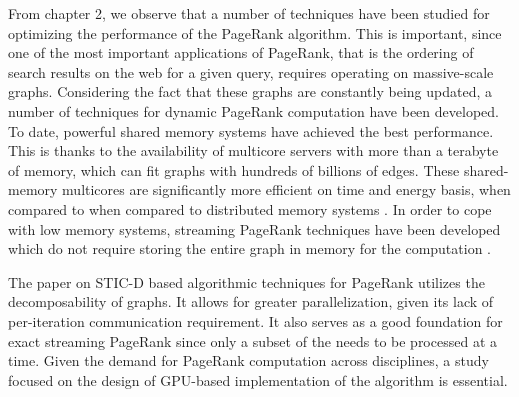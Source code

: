 From chapter 2, we observe that a number of techniques have been studied for optimizing the performance of the PageRank algorithm. This is important, since one of the most important applications of PageRank, that is the ordering of search results on the web for a given query, requires operating on massive-scale graphs. Considering the fact that these graphs are constantly being updated, a number of techniques for dynamic PageRank computation have been developed. To date, powerful shared memory systems have achieved the best performance. This is thanks to the availability of multicore servers with more than a terabyte of memory, which can fit graphs with hundreds of billions of edges. These shared-memory multicores are significantly more efficient on time and energy basis, when compared to when compared to distributed memory systems \cite{graph-shun13}. In order to cope with low memory systems, streaming PageRank techniques have been developed which do not require storing the entire graph in memory for the computation \cite{pr-sarma11}.

The paper on STIC-D based algorithmic techniques for PageRank \cite{pr-sticd16} utilizes the decomposability of graphs. It allows for greater parallelization, given its lack of per-iteration communication requirement. It also serves as a good foundation for exact streaming PageRank since only a subset of the needs to be processed at a time. Given the demand for PageRank computation across disciplines, a study focused on the design of GPU-based implementation of the algorithm is essential.


